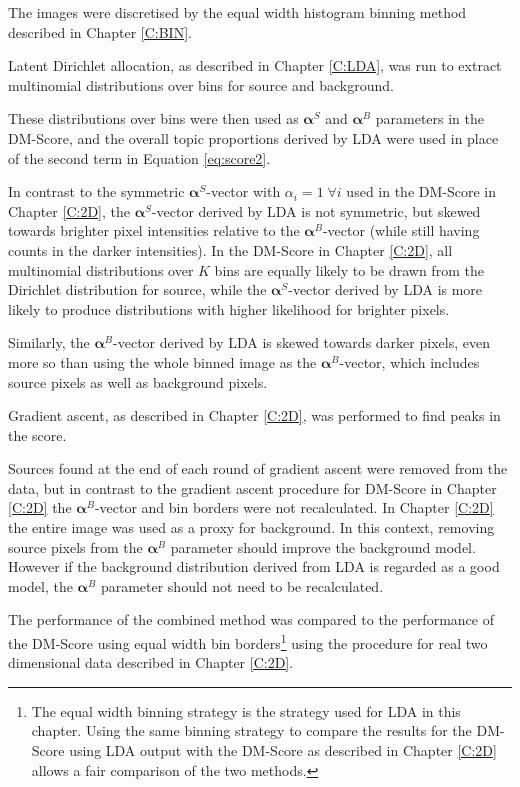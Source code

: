 The images were discretised by the equal width histogram binning method described in Chapter \ref{C:BIN}. 

Latent Dirichlet allocation, as described in Chapter \ref{C:LDA}, was run to extract multinomial distributions over bins for source and background.

These distributions over bins were then used as $\boldsymbol{\alpha}^S$ and $\boldsymbol{\alpha}^B$ parameters in the DM-Score, and the overall topic proportions derived by LDA were used in place of the second term in Equation \ref{eq:score2}.

In contrast to the symmetric $\boldsymbol{\alpha}^S$-vector with $\alpha_i = 1 \; \forall i$ used in the DM-Score in Chapter \ref{C:2D}, the $\boldsymbol{\alpha}^S$-vector derived by LDA is not symmetric, but skewed towards brighter pixel intensities relative to the $\boldsymbol{\alpha}^B$-vector (while still having counts in the darker intensities). In the DM-Score in Chapter \ref{C:2D}, all multinomial distributions over $K$ bins are equally likely to be drawn from the Dirichlet distribution for source, while the $\boldsymbol{\alpha}^S$-vector derived by LDA is more likely to produce distributions with higher likelihood for brighter pixels. 

Similarly, the $\boldsymbol{\alpha}^B$-vector derived by LDA is skewed towards darker pixels, even more so than using the whole binned image as the $\boldsymbol{\alpha}^B$-vector, which includes source pixels as well as background pixels.

Gradient ascent, as described in Chapter \ref{C:2D}, was performed to find peaks in the score. 

Sources found at the end of each round of gradient ascent were removed from the data, but in contrast to the gradient ascent procedure for DM-Score in Chapter \ref{C:2D} the $\boldsymbol{\alpha}^B$-vector and bin borders were not recalculated. In Chapter \ref{C:2D} the entire image was used as a proxy for background. In this context, removing source pixels from the $\boldsymbol{\alpha}^B$ parameter should improve the background model. However if the background distribution derived from LDA is regarded as a good model, the $\boldsymbol{\alpha}^B$ parameter should not need to be recalculated.

The performance of the combined method was compared to the performance of the DM-Score using equal width bin borders\footnote{The equal width binning strategy is the strategy used for LDA in this chapter. Using the same binning strategy to compare the results for the DM-Score using LDA output with the DM-Score as described in Chapter \ref{C:2D} allows a fair comparison of the two methods.} using the procedure for real two dimensional data described in Chapter \ref{C:2D}.

